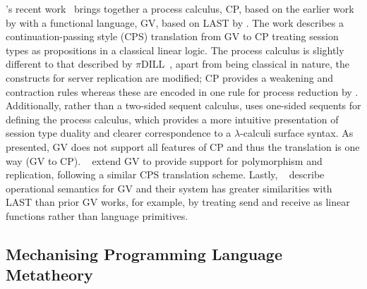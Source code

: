 \documentclass{mprop}
\begin{document}
\citeauthor{Wadler:2014}'s recent work~\cite{Wadler:2014} brings together a
process calculus, CP, based on the earlier work by
\citeauthor{Caires:2010:STI} with a functional language, GV, based on LAST by
\citeauthor{Gay:2010:LAST}. The work describes a continuation-passing style
(CPS) translation from GV to CP treating session types as propositions in a
classical linear logic. The process calculus is slightly different to that
described by $\pi$DILL~\cite{Caires:2010:STI}, apart from being classical in
nature, the constructs for server replication are modified; CP provides a
weakening and contraction rules whereas these are encoded in one rule for
process reduction by \citeauthor{Caires:2010:STI}. Additionally, rather than a
two-sided sequent calculus, \citeauthor{Wadler:2014} uses one-sided sequents
for defining the process calculus, which provides a more intuitive
presentation of session type duality and clearer correspondence to a
$\lambda$-calculi surface syntax. As presented, GV does not support all
features of CP and thus the translation is one way (GV to
CP). \citeauthor{Lindley:2014:SAP}~\cite{Lindley:2014:SAP} extend GV to
provide support for polymorphism and replication, following a similar CPS
translation scheme. Lastly,
\citeauthor{Lindley:2014:SPS}~\cite{Lindley:2014:SPS} describe operational
semantics for GV and their system has greater similarities with LAST than
prior GV works, for example, by treating send and receive as linear functions
rather than language primitives.


\subsection{Mechanising Programming Language Metatheory}
\end{document}
